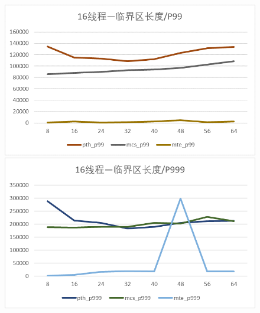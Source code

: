 \documentclass[UTF8]{ctexart}
\begin{document}
\begin{enumerate}
    \begin{figure}[!h]
        \centering
        \begin{minipage}{0.49\linewidth}
            \centering
            \includegraphics[scale=0.64]{../images/3.png}
        \end{minipage}
        \begin{minipage}{0.49\linewidth}
            \centering
            \includegraphics[scale=0.64]{../images/4.png}
        \end{minipage}
    \end{figure}


\end{enumerate}
\end{document}
